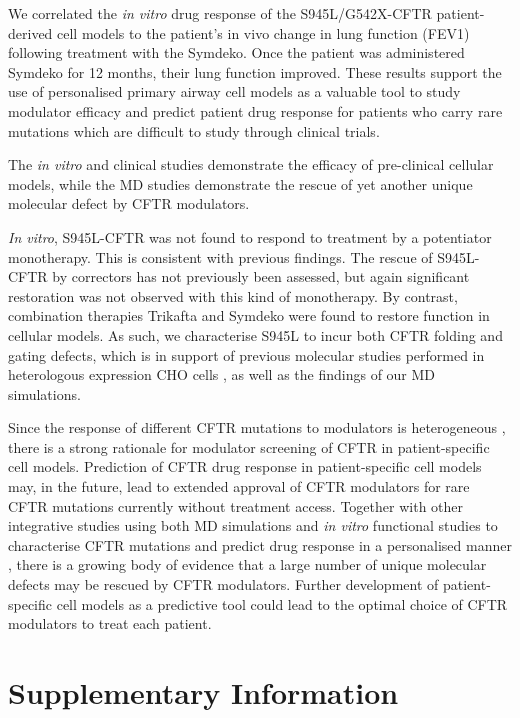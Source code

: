 We correlated the \textit{in vitro} drug response of the S945L/G542X-CFTR patient-derived cell models to the patient’s in vivo change in lung function (FEV1) following treatment with the Symdeko. Once the patient was administered Symdeko for 12 months, their lung function improved. These results support the use of personalised primary airway cell models as a valuable tool to study modulator efficacy and predict patient drug response for patients who carry rare mutations which are difficult to study through clinical trials. 

The \textit{in vitro} and clinical studies demonstrate the efficacy of pre-clinical cellular models, while the MD studies demonstrate the rescue of yet another unique molecular defect by CFTR modulators.  

\textit{In vitro}, S945L-CFTR was not found to respond to treatment by a potentiator monotherapy. This is consistent with previous findings. The rescue of S945L-CFTR by correctors has not previously been assessed, but again significant restoration was not observed with this kind of monotherapy. By contrast, combination therapies Trikafta and Symdeko were found to restore function in cellular models. As such, we characterise S945L to incur both CFTR folding and gating defects, which is in support of previous molecular studies performed in heterologous expression CHO cells \cite{seibert1996}, as well as the findings of our MD simulations.

Since the response of different CFTR mutations \cite{laselva2021} to modulators is heterogeneous \cite{wainwright2015,boyle2014}, there is a strong rationale for modulator screening of CFTR in patient-specific cell models. Prediction of CFTR drug response in patient-specific cell models may, in the future, lead to extended approval of CFTR modulators for rare CFTR mutations currently without treatment access. Together with other integrative studies using both MD simulations and \textit{in vitro} functional studies to characterise CFTR mutations and predict drug response in a personalised manner \cite{wong2022,wong2022a,billet2020,sabusap2021}, there is a growing body of evidence that a large number of unique molecular defects may be rescued by CFTR modulators. Further development of patient-specific cell models as a predictive tool could lead to the optimal choice of CFTR modulators to treat each patient.  

\section {Supplementary Information}
\renewcommand{\thefigure}{\arabic{chapter}.S\arabic{figure}}
\setcounter{figure}{0}

